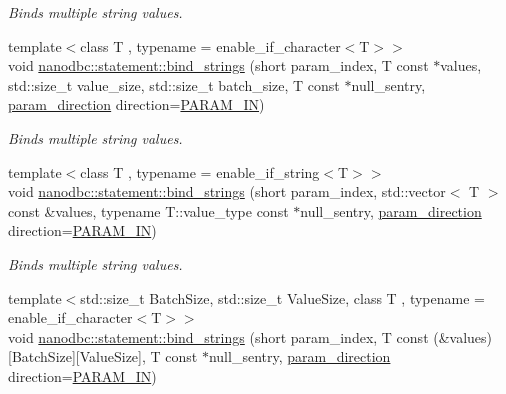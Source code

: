 \begin{DoxyCompactItemize}
\begin{DoxyCompactList}\small\item\em Binds multiple string values. \end{DoxyCompactList}\item 
{\footnotesize template$<$class T , typename  = enable\+\_\+if\+\_\+character$<$\+T$>$$>$ }\\void \mbox{\hyperlink{group__bind__strings_gaab3ea540d9998532141d11970107767d}{nanodbc\+::statement\+::bind\+\_\+strings}} (short param\+\_\+index, T const $\ast$values, std\+::size\+\_\+t value\+\_\+size, std\+::size\+\_\+t batch\+\_\+size, T const $\ast$null\+\_\+sentry, \mbox{\hyperlink{classnanodbc_1_1statement_a523142f53cbbee8d68a074da993e7fa6}{param\+\_\+direction}} direction=\mbox{\hyperlink{classnanodbc_1_1statement_a523142f53cbbee8d68a074da993e7fa6ae33f42ce0677d00c291ff4d8e39f99de}{P\+A\+R\+A\+M\+\_\+\+IN}})
\begin{DoxyCompactList}\small\item\em Binds multiple string values. \end{DoxyCompactList}\item 
{\footnotesize template$<$class T , typename  = enable\+\_\+if\+\_\+string$<$\+T$>$$>$ }\\void \mbox{\hyperlink{group__bind__strings_gab3fcf94cac28bc25a794c3cd9b9cf47c}{nanodbc\+::statement\+::bind\+\_\+strings}} (short param\+\_\+index, std\+::vector$<$ T $>$ const \&values, typename T\+::value\+\_\+type const $\ast$null\+\_\+sentry, \mbox{\hyperlink{classnanodbc_1_1statement_a523142f53cbbee8d68a074da993e7fa6}{param\+\_\+direction}} direction=\mbox{\hyperlink{classnanodbc_1_1statement_a523142f53cbbee8d68a074da993e7fa6ae33f42ce0677d00c291ff4d8e39f99de}{P\+A\+R\+A\+M\+\_\+\+IN}})
\begin{DoxyCompactList}\small\item\em Binds multiple string values. \end{DoxyCompactList}\item 
{\footnotesize template$<$std\+::size\+\_\+t Batch\+Size, std\+::size\+\_\+t Value\+Size, class T , typename  = enable\+\_\+if\+\_\+character$<$\+T$>$$>$ }\\void \mbox{\hyperlink{group__bind__strings_gaeb56183ce0f1c8a213b3088b8b03b6ff}{nanodbc\+::statement\+::bind\+\_\+strings}} (short param\+\_\+index, T const (\&values)\mbox{[}Batch\+Size\mbox{]}\mbox{[}Value\+Size\mbox{]}, T const $\ast$null\+\_\+sentry, \mbox{\hyperlink{classnanodbc_1_1statement_a523142f53cbbee8d68a074da993e7fa6}{param\+\_\+direction}} direction=\mbox{\hyperlink{classnanodbc_1_1statement_a523142f53cbbee8d68a074da993e7fa6ae33f42ce0677d00c291ff4d8e39f99de}{P\+A\+R\+A\+M\+\_\+\+IN}})

\end{DoxyCompactItemize}
